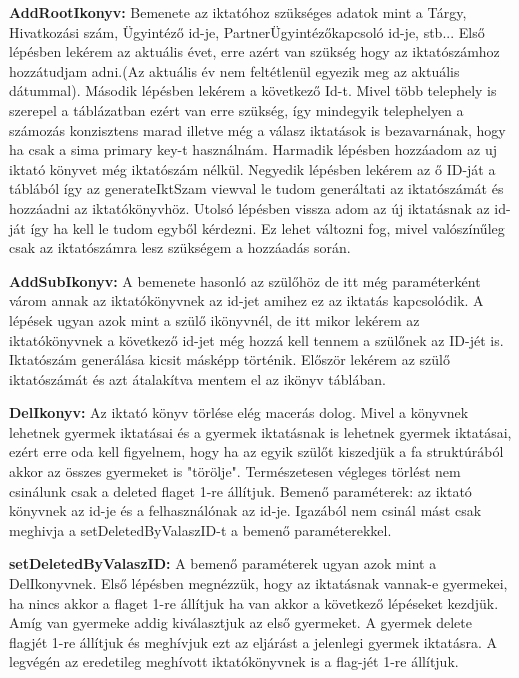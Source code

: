 \documentclass[conference]{IEEEtran}
\begin{document}
\textbf{AddRootIkonyv:}
	Bemenete az iktatóhoz szükséges adatok mint a Tárgy, Hivatkozási szám, Ügyintéző id-je, PartnerÜgyintézőkapcsoló id-je, stb... Első lépésben lekérem az aktuális évet, erre azért van szükség hogy az iktatószámhoz hozzátudjam adni.(Az aktuális év nem feltétlenül egyezik meg az aktuális dátummal). Második lépésben lekérem a következő Id-t. Mivel több telephely is szerepel a táblázatban ezért van erre szükség, így mindegyik telephelyen a számozás konzisztens marad illetve még a válasz iktatások is bezavarnának, hogy ha csak a sima primary key-t használnám. Harmadik lépésben hozzáadom az uj iktató könyvet még iktatószám nélkül. Negyedik lépésben lekérem az ő ID-ját a táblából így az generateIktSzam viewval le tudom generáltati az iktatószámát és hozzáadni az iktatókönyvhöz. Utolsó lépésben vissza adom az új iktatásnak az id-ját így ha kell le tudom egyből kérdezni. Ez lehet változni fog, mivel valószínűleg csak az iktatószámra lesz szükségem a hozzáadás során.

\textbf{AddSubIkonyv:}
 	A bemenete hasonló az szülőhöz de itt még paraméterként várom annak az iktatókönyvnek az id-jet amihez ez az iktatás kapcsolódik. A lépések ugyan azok mint a szülő ikönyvnél, de itt mikor lekérem az iktatókönyvnek a következő id-jet még hozzá kell tennem a szülőnek az ID-jét is. Iktatószám generálása kicsit másképp történik. Először lekérem az szülő  iktatószámát és azt átalakítva mentem el az ikönyv táblában.
 	
\textbf{DelIkonyv:}
 Az iktató könyv törlése elég macerás dolog. Mivel a könyvnek lehetnek gyermek iktatásai és a gyermek iktatásnak is lehetnek gyermek iktatásai, ezért erre oda kell figyelnem, hogy ha az egyik szülőt kiszedjük a fa struktúrából akkor az összes gyermeket is "törölje". Természetesen végleges törlést nem csinálunk csak a deleted flaget 1-re állítjuk.
 Bemenő paraméterek: az iktató könyvnek az id-je és a felhasználónak az id-je. Igazából nem csinál mást csak meghivja a setDeletedByValaszID-t a bemenő paraméterekkel.

\textbf{setDeletedByValaszID:}
 A bemenő paraméterek ugyan azok mint a DelIkonyvnek. Első lépésben megnézzük, hogy az iktatásnak vannak-e gyermekei, ha nincs akkor a flaget 1-re állítjuk ha van akkor a következő lépéseket kezdjük. Amíg van gyermeke addig kiválasztjuk az első gyermeket. A gyermek delete flagjét 1-re állítjuk és meghívjuk ezt az eljárást a jelenlegi gyermek iktatásra. A legvégén az eredetileg meghívott iktatókönyvnek is a flag-jét 1-re állítjuk. 
 
\end{document}
